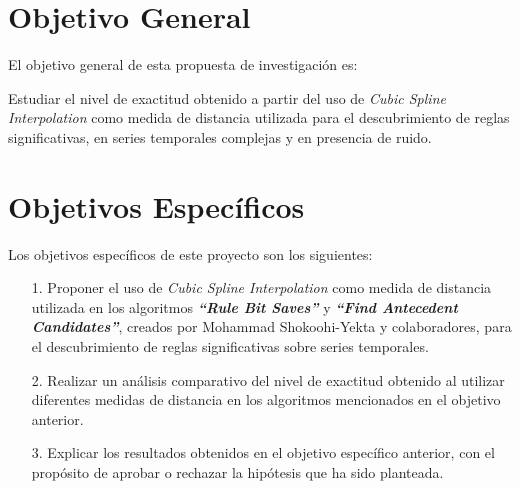 \section{\textbf{Objetivo General}}
El objetivo general de esta propuesta de investigaci\'on es:\par
Estudiar el nivel de exactitud obtenido a partir del uso de \textit{Cubic Spline Interpolation} como medida de distancia utilizada para el descubrimiento de reglas signi\-ficativas, en series temporales complejas y en presencia de ruido.
\section{\textbf{Objetivos Espec\'ificos}}
Los objetivos espec\'ificos de este proyecto son los siguientes:
\begin{itemize}
\item [1.] Proponer el uso de \textit{Cubic Spline Interpolation} como medida de distancia utilizada en los algoritmos \textit{\textbf{\enquote{Rule Bit Saves}}} y \textit{\textbf{\enquote{Find Antecedent Candidates}}}, creados por Mohammad Shokoohi-Yekta y colaboradores, para el descubrimiento de reglas significativas sobre series temporales.
	\item [2.] Realizar un an\'alisis comparativo del nivel de exactitud obtenido al utilizar diferen\-tes medidas de distancia en los algoritmos mencionados en el objetivo anterior.
\item [3.] Explicar los resultados obtenidos en el objetivo espec\'ifico anterior, con el prop\'osito de aprobar o rechazar la hip\'otesis que ha sido planteada.
\end{itemize}